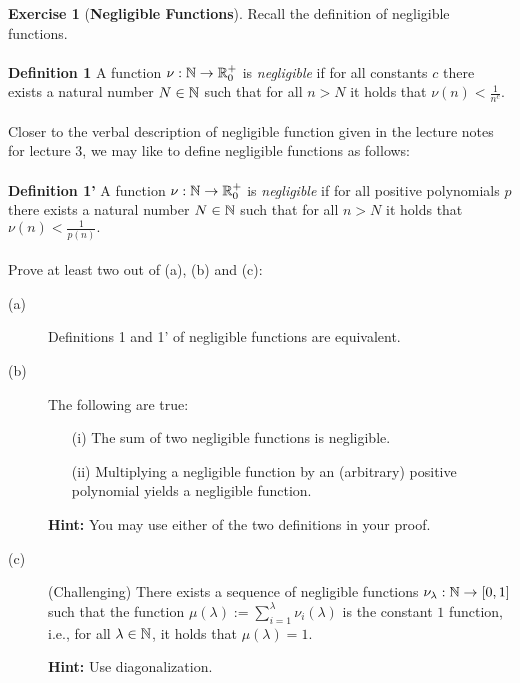 \documentclass[envcountsame,runningheads,notitlepage]{../llncs}
\theoremstyle{definition}
\newtheorem{graded}[crossed]{Exercise}
\begin{document}
\begin{graded}[\textbf{Negligible Functions}]
Recall the definition of negligible functions.
\\
\\
\textbf{Definition 1} A function \(\nu: \mathbb{N} \to \mathbb{R}^+_0\) is \textit{negligible} if for all constants \(c\) there exists a natural number \(N \in \mathbb{N}\) such that for all \(n > N\) it holds that \(\nu(n) < \frac{1}{n^c}.\)\\
\\
Closer to the verbal description of negligible function given in the lecture notes for lecture 3, we may like to define negligible functions as follows:\\
\\
\textbf{Definition 1'} A function \(\nu: \mathbb{N} \to \mathbb{R}^+_0\) is \textit{negligible} if for all positive polynomials \(p\) there exists a natural number \(N \in \mathbb{N}\) such that for all \(n > N\) it holds that \(\nu(n) < \frac{1}{p(n)}.\)\\
\\
Prove at least two out of (a), (b) and (c):
\begin{description}
\item[(a)] Definitions 1 and 1' of negligible functions are equivalent.
\item[(b)] The following are true:
	\begin{itemize}
	\item[(i)] The sum of two negligible functions is negligible.
	\item[(ii)] Multiplying a negligible function by an (arbitrary) positive polynomial yields a negligible function.
\end{itemize}
\textbf{Hint:} You may use either of the two definitions in your proof.
\item[(c)] (Challenging) There exists a sequence of negligible functions $\nu_\lambda:\mathbb{N}\rightarrow[0,1]$ such that the function $\mu(\lambda):=\sum_{i=1}^\lambda \nu_i(\lambda)$ is the constant $1$ function, i.e., for all $\lambda\in\mathbb{N}$, it holds that $\mu(\lambda)=1$.

\textbf{Hint:} Use diagonalization.
\end{description}
\end{graded}
\end{document}

